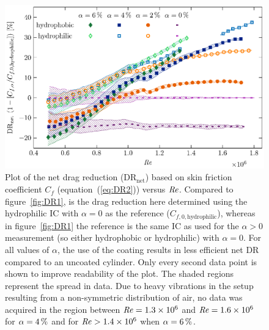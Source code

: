 \begin{figure}
\centering \includegraphics{Figures/fig9}
\caption{Plot of the net drag reduction (DR$_\text{net}$) based on skin friction coefficient $C_f$ (equation~(\ref{eq:DR2})) versus $\mbox{\textit{Re}}$. Compared to figure~\ref{fig:DR1}, is the drag reduction here determined using the hydrophilic IC with $\alpha = 0$ as the reference ($C_{f,0,\text{hydrophilic}}$), whereas in figure~\ref{fig:DR1} the reference is the same IC as used for the $\alpha > 0$ measurement (so either hydrophobic or hydrophilic) with $\alpha = 0$.  For all values of $\alpha$, the use of the coating results in less efficient net DR compared to an uncoated cylinder. Only every second data point is shown to improve readability of the plot. The shaded regions represent the spread in data.  Due to heavy vibrations in the setup resulting from a non-symmetric distribution of air, no data was acquired in the region between $\mbox{\textit{Re}} = 1.3\times10^6$ and $\mbox{\textit{Re}} = 1.6\times10^6$ for $\alpha=\SI{4}{\percent}$ and for $\mbox{\textit{Re}} > 1.4\times10^6$ when $\alpha=\SI{6}{\percent}$.}\label{fig:DR2}
\end{figure}


